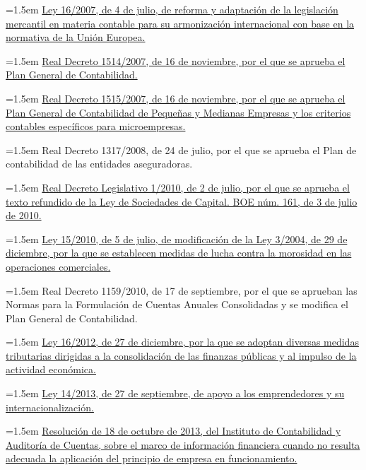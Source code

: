 \documentclass[10pt,a4paper]{article}
\begin{document}
\noindent\hangindent=1.5em \href{https://www.boe.es/eli/es/l/2007/07/04/16/con}{Ley 16/2007, de 4 de julio, de reforma y adaptación de la legislación mercantil en materia contable para su armonización internacional con base en la normativa de la Unión Europea.}

\noindent\hangindent=1.5em \href{https://www.boe.es/eli/es/rd/2007/11/16/1514/con}{Real Decreto 1514/2007, de 16 de noviembre, por el que se aprueba el Plan General de Contabilidad.}

\noindent\hangindent=1.5em \href{https://www.boe.es/eli/es/rd/2007/11/16/1515/con}{Real Decreto 1515/2007, de 16 de noviembre, por el que se aprueba el Plan General de Contabilidad de Pequeñas y Medianas Empresas y los criterios contables específicos para microempresas.}

\noindent\hangindent=1.5em Real Decreto 1317/2008, de 24 de julio, por el que se aprueba el Plan de contabilidad de las entidades aseguradoras.

\noindent\hangindent=1.5em \href{https://www.boe.es/eli/es/rdlg/2010/07/02/1/con}{Real Decreto Legislativo 1/2010, de 2 de julio, por el que se aprueba el texto refundido de la Ley de Sociedades de Capital. BOE núm. 161, de 3 de julio de 2010.}

\noindent\hangindent=1.5em \href{https://www.boe.es/eli/es/l/2010/07/05/15}{Ley 15/2010, de 5 de julio, de modificación de la Ley 3/2004, de 29 de diciembre, por la que se establecen medidas de lucha contra la morosidad en las operaciones comerciales.}

\noindent\hangindent=1.5em Real Decreto 1159/2010, de 17 de septiembre, por el que se aprueban las Normas para la Formulación de Cuentas Anuales Consolidadas y se modifica el Plan General de Contabilidad.

\noindent\hangindent=1.5em \href{https://www.boe.es/eli/es/l/2012/12/27/16/con}{Ley 16/2012, de 27 de diciembre, por la que se adoptan diversas medidas tributarias dirigidas a la consolidación de las finanzas públicas y al impulso de la actividad económica.}

\noindent\hangindent=1.5em \href{https://www.boe.es/eli/es/l/2013/09/27/14/con}{Ley 14/2013, de 27 de septiembre, de apoyo a los emprendedores y su internacionalización.}

\noindent\hangindent=1.5em \href{https://www.boe.es/eli/es/res/2013/10/18/(3)}{Resolución de 18 de octubre de 2013, del Instituto de Contabilidad y Auditoría de Cuentas, sobre el marco de información financiera cuando no resulta adecuada la aplicación del principio de empresa en funcionamiento.}
\end{document}
